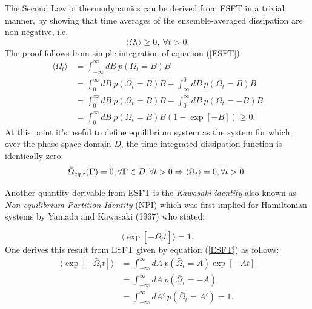 \documentclass[a4paper,12pt]{article}
\begin{document}
The Second Law of thermodynamics can be derived from ESFT in a trivial manner, by showing that time averages of the ensemble-averaged dissipation are non negative, i.e.
\begin{equation}
  \langle\Omega_t\rangle\geq 0,\  \forall t > 0.
\end{equation}
 The proof follows from simple integration of equation (\ref{ESFT}):
\begin{equation}
\begin{aligned}
  \langle \Omega_t \rangle &= \int_{-\infty}^{\infty} dB\ p(\Omega_t=B)B\\
  &=\int_0^{\infty} dB\ p(\Omega_t=B)B +\int_{\infty}^{0} dB\ p(\Omega_t=B)B \\
  &=\int_0^{\infty} dB\ p(\Omega_t=B)B -\int_{0}^{\infty} dB\ p(\Omega_t=-B)B \\
  &= \int_0^{\infty} dB\ p(\Omega_t=B)B(1-\exp[-B]) \geq 0.
\end{aligned}
\end{equation} 
At this point it's useful to define equilibrium system as the system for which, over the phase space domain $D$, the time-integrated dissipation function is identically zero:
\begin{equation}
  \bar{\Omega}_{eq,t}(\bm{\Gamma})=0, \forall\bm{\Gamma}\in  D, \forall t >0 \\
  \Rightarrow \langle \Omega_t \rangle = 0, \forall t > 0.
\end{equation}

Another quantity derivable from ESFT is the \textit{Kawasaki identity} also known as \textit{Non-equilibrium Partition Identity} (NPI) which was first implied for Hamiltonian systems by Yamada and Kawasaki (1967) \cite{Yamada:1967uo} who stated:

\begin{equation}
  \langle \exp[-\bar{\Omega}_t t] \rangle =1.
\end{equation}
One derives this result from ESFT given by equation (\ref{ESFT}) as follows:
\begin{equation}
\begin{aligned}
  \langle \exp[-\bar{\Omega}_t t] \rangle &= \int_{-\infty}^{\infty} dA\ p(\bar{\Omega}_t=A)\exp[-A t]\\
  &=\int_{-\infty}^{\infty} dA\ p(\bar{\Omega}_t=-A)\\
  &=\int_{-\infty}^{\infty} dA'\ p(\bar{\Omega}_t=A')=1.
\end{aligned}
\end{equation}
\end{document}
